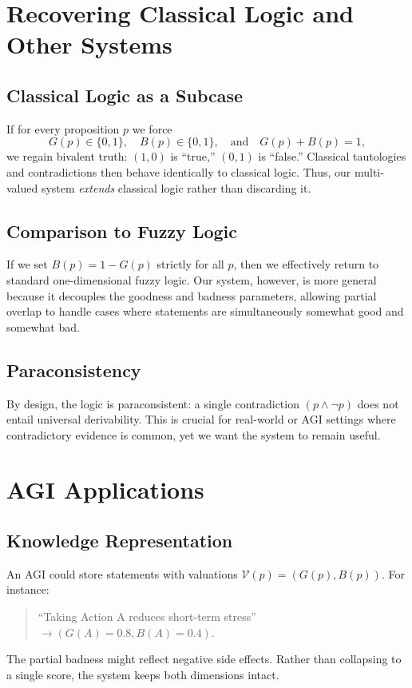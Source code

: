 \documentclass[11pt]{article}
\begin{document}
\section{Recovering Classical Logic and Other Systems}

\subsection{Classical Logic as a Subcase}

If for every proposition \(p\) we force
\[
  G(p) \in \{0,1\}, \quad B(p) \in \{0,1\}, \quad 
  \text{and}\quad G(p) + B(p) = 1,
\]
we regain bivalent truth: \((1,0)\) is ``true,'' \((0,1)\) is ``false.'' 
Classical tautologies and contradictions then behave identically to classical logic. 
Thus, our multi-valued system \emph{extends} classical logic rather than discarding it.

\subsection{Comparison to Fuzzy Logic}

If we set \(B(p)=1-G(p)\) strictly for all \(p\), then we effectively return to 
standard one-dimensional fuzzy logic. Our system, however, is more general because 
it decouples the goodness and badness parameters, allowing partial overlap to handle 
cases where statements are simultaneously somewhat good and somewhat bad.

\subsection{Paraconsistency}

By design, the logic is paraconsistent: a single contradiction 
\((p \land \lnot p)\) does not entail universal derivability. This is crucial for 
real-world or AGI settings where contradictory evidence is common, yet we want 
the system to remain useful.

\section{AGI Applications}

\subsection{Knowledge Representation}

An AGI could store statements with valuations 
\(\mathcal{V}(p)=(G(p), B(p))\). For instance:
\begin{quote}
  ``Taking Action A reduces short-term stress'' \(\rightarrow (G(A)=0.8, B(A)=0.4)\).
\end{quote}
The partial badness might reflect negative side effects. Rather than collapsing to a single 
score, the system keeps both dimensions intact.
\end{document}
